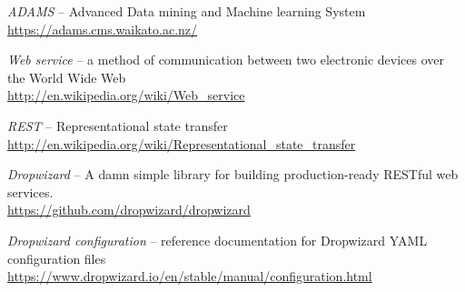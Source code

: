 
\begin{thebibliography}{999}

		\textit{ADAMS} -- Advanced Data mining and Machine learning System \\
		{\scriptsize \url{https://adams.cms.waikato.ac.nz/}{}}
		
		\textit{Web service} -- a method of communication between two electronic 
		devices over the World Wide Web \\
		{\scriptsize \url{http://en.wikipedia.org/wiki/Web_service}{}}
		
		\textit{REST} -- Representational state transfer \\
		{\scriptsize \url{http://en.wikipedia.org/wiki/Representational_state_transfer}{}}

		\textit{Dropwizard} -- A damn simple library for building production-ready RESTful web services. \\
		\url{https://github.com/dropwizard/dropwizard}{}

	    \textit{Dropwizard configuration} -- reference documentation for Dropwizard YAML configuration files \\
	    \url{https://www.dropwizard.io/en/stable/manual/configuration.html}{}

\end{thebibliography}
